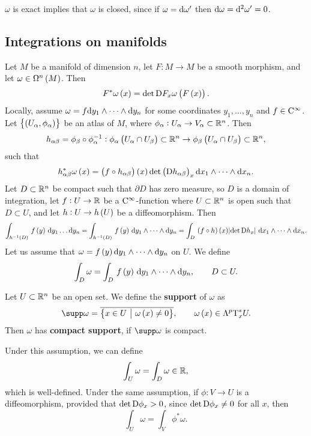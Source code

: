 $ \omega $ is exact implies that $ \omega $ is closed, since if $ \omega = \mathrm{d}\omega' $ then $ \mathrm{d}\omega = \mathrm{d}^2\omega' = 0 $.

\subsection{Integrations on manifolds}

Let $ M $ be a manifold of dimension $ n $, let $ F : M \to M $ be a smooth morphism, and let $ \omega \in \Omega^n\br{M} $. Then
$$ F^*\omega\br{x} = \det \D F_x\omega\br{F\br{x}}. $$
Locally, assume $ \omega = f \mathrm{d} y_1 \wedge \dots \wedge \mathrm{d} y_n $ for some coordinates $ y_1, \dots, y_n $ and $ f \in \mathrm{C}^\infty $. Let $ \cbr{\br{U_\alpha, \phi_\alpha}} $ be an atlas of $ M $, where $ \phi_\alpha : U_\alpha \to V_\alpha \subset \mathbb{R}^n $. Then
$$ h_{\alpha\beta} = \phi_\beta \circ \phi_\alpha^{-1} : \phi_\alpha\br{U_\alpha \cap U_\beta} \subset \RR^n \to \phi_\beta\br{U_\alpha \cap U_\beta} \subset \RR^n, $$
such that
$$ h_{\alpha\beta}^*\omega\br{x} = \br{f \circ h_{\alpha\beta}}\br{x}\det \br{\D h_{\alpha\beta}}_x \d x_1 \wedge \dots \wedge \d x_n. $$
Let $ D \subset \mathbb{R}^n $ be compact such that $ \partial D $ has zero measure, so $ D $ is a domain of integration, let $ f : U \to \mathbb{R} $ be a $ \mathrm{C}^\infty $-function where $ U \subset \mathbb{R}^n $ is open such that $ D \subset U $, and let $ h : U \to h\br{U} $ be a diffeomorphism. Then
$$ \intd{h^{-1}\br{D}}{}{f\br{y}}{y_1 \dots \d y_n} = \intd{h^{-1}\br{D}}{}{f\br{y}}{y_1 \wedge \dots \wedge \d y_n} = \intd{D}{}{\br{f \circ h}\br{x}\abs{\det \D h_x}}{x_1 \wedge \dots \wedge \d x_n}. $$
Let us assume that $ \omega = f\br{y}\d y_1 \wedge \dots \wedge \d y_n $ on $ U $. We define
$$ \int_D \omega = \intd{D}{}{f\br{y}}{y_1 \wedge \dots \wedge \d y_n}, \qquad D \subset U. $$

\begin{definition}
Let $ U \subset \mathbb{R}^n $ be an open set. We define the \textbf{support} of $ \omega $ as
$$ \supp \omega = \overline{\cbr{x \in U \st \omega\br{x} \ne 0}}, \qquad \omega\br{x} \in \Lambda^p\T_x^*U. $$
Then $ \omega $ has \textbf{compact support}, if $ \supp \omega $ is compact.
\end{definition}

\begin{fact*}
Under this assumption, we can define
$$ \int_U \omega = \int_D \omega \in \mathbb{R}, $$
which is well-defined. Under the same assumption, if $ \phi : V \to U $ is a diffeomorphism, provided that $ \det \mathrm{D}\phi_x > 0 $, since $ \det \mathrm{D}\phi_x \ne 0 $ for all $ x $, then
$$ \int_U \omega = \int_V \phi^*\omega. $$
\end{fact*}

